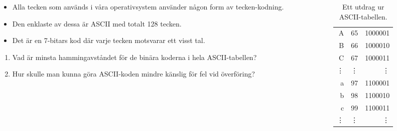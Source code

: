 \begin{frame}
  \begin{columns}
    \begin{column}{0.7\columnwidth}
      \begin{exercise}
        \begin{itemize}
          \item Alla tecken som används i våra operativsystem använder någon 
            form av tecken-kodning.
          \item Den enklaste av dessa är ASCII med totalt 128 tecken.
          \item Det är en 7-bitars kod där varje tecken motsvarar ett visst 
            tal.
        \end{itemize}
        \begin{enumerate}
          \item Vad är minsta hammingavståndet för de binära koderna i hela 
            ASCII-tabellen?
          \item Hur skulle man kunna göra ASCII-koden mindre känslig för fel 
            vid överföring?
        \end{enumerate}
      \end{exercise}
    \end{column}
    \begin{column}{0.3\columnwidth}
      \begin{table}
        \begin{tabular}{rrr}
          A & 65 & 1000001 \\
          B & 66 & 1000010 \\
          C & 67 & 1000011 \\
          \vdots & \vdots & \vdots \\
          a & 97 & 1100001 \\
          b & 98 & 1100010 \\
          c & 99 & 1100011 \\
          \vdots & \vdots & \vdots
        \end{tabular}
        \caption{Ett utdrag ur ASCII-tabellen.}
      \end{table}
    \end{column}
  \end{columns}
\end{frame}

%
